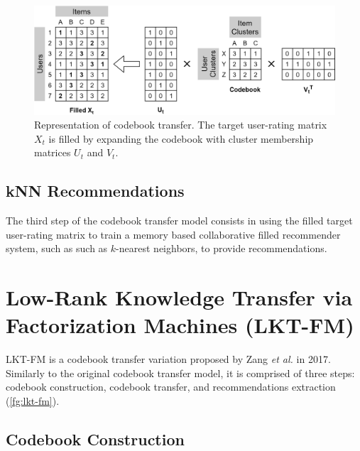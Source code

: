 \begin{figure}[hbt]
\centering
\includegraphics[width=\textwidth]{pictures/codebook-transfer}
\caption{Representation of codebook transfer. The target user-rating matrix $X_t$ is filled by expanding the codebook with cluster membership matrices $U_t$ and $V_t$.}
\label{fg:codebook-transfer}
\end{figure}


\subsection{kNN Recommendations}

The third step of the codebook transfer model consists in using the filled target user-rating matrix to train a memory based collaborative filled recommender system, such as such as $k$-nearest neighbors, to provide recommendations.


\section{Low-Rank Knowledge Transfer via Factorization Machines (LKT-FM)}

LKT-FM is a codebook transfer variation proposed by Zang \textit{et al.} \cite{10.1007/978-3-319-71246-8_39} in 2017.\\
Similarly to the original codebook transfer model, it is comprised of three steps: codebook construction, codebook transfer, and recommendations extraction (\autoref{fg:lkt-fm}).


\subsection{Codebook Construction}

